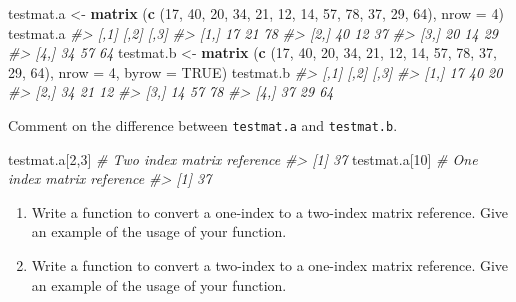 \documentclass[
]{book}
\newenvironment{Shaded}{\begin{snugshade}}{\end{snugshade}}
\newcommand{\AttributeTok}[1]{\textcolor[rgb]{0.13,0.29,0.53}{#1}}
\newcommand{\CommentTok}[1]{\textcolor[rgb]{0.56,0.35,0.01}{\textit{#1}}}
\newcommand{\ConstantTok}[1]{\textcolor[rgb]{0.56,0.35,0.01}{#1}}
\newcommand{\DecValTok}[1]{\textcolor[rgb]{0.00,0.00,0.81}{#1}}
\newcommand{\FunctionTok}[1]{\textcolor[rgb]{0.13,0.29,0.53}{\textbf{#1}}}
\newcommand{\NormalTok}[1]{#1}
\newcommand{\OtherTok}[1]{\textcolor[rgb]{0.56,0.35,0.01}{#1}}
\begin{document}
\begin{Shaded}
\begin{Highlighting}[]
\NormalTok{testmat.a }\OtherTok{\textless{}{-}} \FunctionTok{matrix}\NormalTok{ (}\FunctionTok{c}\NormalTok{ (}\DecValTok{17}\NormalTok{, }\DecValTok{40}\NormalTok{, }\DecValTok{20}\NormalTok{, }\DecValTok{34}\NormalTok{, }\DecValTok{21}\NormalTok{, }\DecValTok{12}\NormalTok{, }\DecValTok{14}\NormalTok{, }\DecValTok{57}\NormalTok{, }
                        \DecValTok{78}\NormalTok{, }\DecValTok{37}\NormalTok{, }\DecValTok{29}\NormalTok{, }\DecValTok{64}\NormalTok{), }\AttributeTok{nrow =} \DecValTok{4}\NormalTok{)}
\NormalTok{testmat.a}
\CommentTok{\#\textgreater{}      [,1] [,2] [,3]}
\CommentTok{\#\textgreater{} [1,]   17   21   78}
\CommentTok{\#\textgreater{} [2,]   40   12   37}
\CommentTok{\#\textgreater{} [3,]   20   14   29}
\CommentTok{\#\textgreater{} [4,]   34   57   64}
\NormalTok{testmat.b }\OtherTok{\textless{}{-}} \FunctionTok{matrix}\NormalTok{ (}\FunctionTok{c}\NormalTok{ (}\DecValTok{17}\NormalTok{, }\DecValTok{40}\NormalTok{, }\DecValTok{20}\NormalTok{, }\DecValTok{34}\NormalTok{, }\DecValTok{21}\NormalTok{, }\DecValTok{12}\NormalTok{, }\DecValTok{14}\NormalTok{, }\DecValTok{57}\NormalTok{, }
                        \DecValTok{78}\NormalTok{, }\DecValTok{37}\NormalTok{, }\DecValTok{29}\NormalTok{, }\DecValTok{64}\NormalTok{), }\AttributeTok{nrow =} \DecValTok{4}\NormalTok{, }\AttributeTok{byrow =} \ConstantTok{TRUE}\NormalTok{)}
\NormalTok{testmat.b}
\CommentTok{\#\textgreater{}      [,1] [,2] [,3]}
\CommentTok{\#\textgreater{} [1,]   17   40   20}
\CommentTok{\#\textgreater{} [2,]   34   21   12}
\CommentTok{\#\textgreater{} [3,]   14   57   78}
\CommentTok{\#\textgreater{} [4,]   37   29   64}
\end{Highlighting}
\end{Shaded}

Comment on the difference between \texttt{testmat.a} and \texttt{testmat.b}.

\begin{Shaded}
\begin{Highlighting}[]
\NormalTok{testmat.a[}\DecValTok{2}\NormalTok{,}\DecValTok{3}\NormalTok{]   }\CommentTok{\# Two index matrix reference}
\CommentTok{\#\textgreater{} [1] 37}
\NormalTok{testmat.a[}\DecValTok{10}\NormalTok{]   }\CommentTok{\# One index matrix reference}
\CommentTok{\#\textgreater{} [1] 37}
\end{Highlighting}
\end{Shaded}

\begin{enumerate}
\def\labelenumi{(\alph{enumi})}
\setcounter{enumi}{4}
\item
  Write a function to convert a one-index to a two-index matrix reference. Give an example of the usage of your function.
\item
  Write a function to convert a two-index to a one-index matrix reference. Give an example of the usage of your function.
\end{enumerate}
\end{document}
